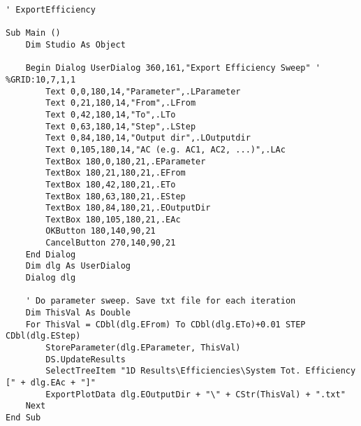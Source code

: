 \begin{lstlisting}[language={[Visual]Basic}, caption={Sweep Total Efficiency macro for CST.}, label=lst:cstmacro_eff]
' ExportEfficiency

Sub Main ()
    Dim Studio As Object

    Begin Dialog UserDialog 360,161,"Export Efficiency Sweep" ' %GRID:10,7,1,1
        Text 0,0,180,14,"Parameter",.LParameter
        Text 0,21,180,14,"From",.LFrom
        Text 0,42,180,14,"To",.LTo
        Text 0,63,180,14,"Step",.LStep
        Text 0,84,180,14,"Output dir",.LOutputdir
        Text 0,105,180,14,"AC (e.g. AC1, AC2, ...)",.LAc
        TextBox 180,0,180,21,.EParameter
        TextBox 180,21,180,21,.EFrom
        TextBox 180,42,180,21,.ETo
        TextBox 180,63,180,21,.EStep
        TextBox 180,84,180,21,.EOutputDir
        TextBox 180,105,180,21,.EAc
        OKButton 180,140,90,21
        CancelButton 270,140,90,21
    End Dialog
    Dim dlg As UserDialog
    Dialog dlg

    ' Do parameter sweep. Save txt file for each iteration
    Dim ThisVal As Double
    For ThisVal = CDbl(dlg.EFrom) To CDbl(dlg.ETo)+0.01 STEP CDbl(dlg.EStep)
        StoreParameter(dlg.EParameter, ThisVal)
        DS.UpdateResults
        SelectTreeItem "1D Results\Efficiencies\System Tot. Efficiency [" + dlg.EAc + "]"
        ExportPlotData dlg.EOutputDir + "\" + CStr(ThisVal) + ".txt"
    Next
End Sub
\end{lstlisting}
